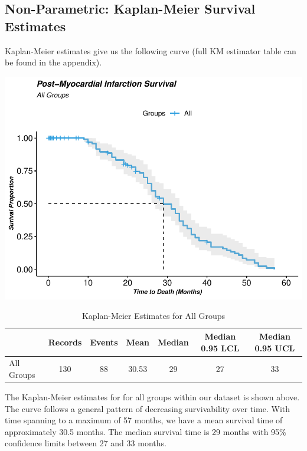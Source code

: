 \documentclass[
]{article}
\begin{document}
\hypertarget{non-parametric-kaplan-meier-survival-estimates}{%
\subsection{Non-Parametric: Kaplan-Meier Survival
Estimates}\label{non-parametric-kaplan-meier-survival-estimates}}

Kaplan-Meier estimates give us the following curve (full KM estimator
table can be found in the appendix).

\begin{center}\includegraphics{markdown_files/figure-latex/km.all-1} \end{center}

\begin{table}[!h]

\caption{\label{tab:ks1}Kaplan-Meier Estimates for All Groups}
\centering
\begin{tabular}[t]{l|c|c|c|c|c|c}
\hline
  & Records & Events & Mean & Median & Median 0.95 LCL & Median 0.95 UCL\\
\hline
All Groups & 130 & 88 & 30.53 & 29 & 27 & 33\\
\hline
\end{tabular}
\end{table}

The Kaplan-Meier estimates for for all groups within our dataset is
shown above. The curve follows a general pattern of decreasing
survivability over time. With time spanning to a maximum of 57 months,
we have a mean survival time of approximately 30.5 months. The median
survival time is 29 months with 95\% confidence limits between 27 and 33
months.
\end{document}
